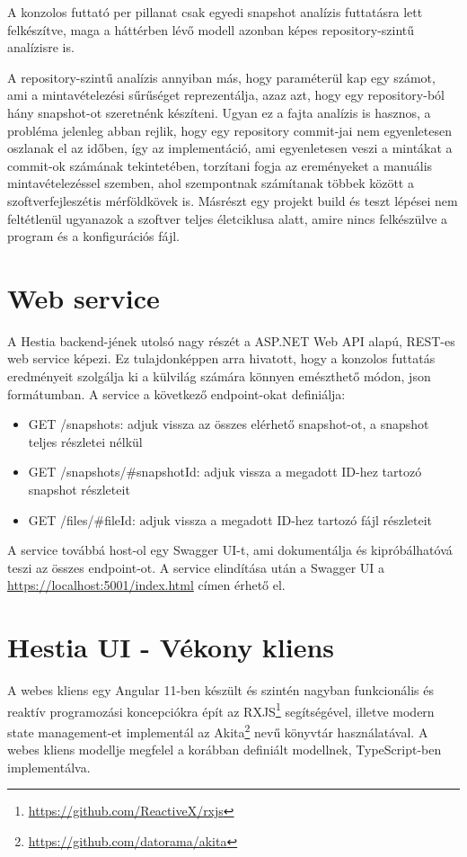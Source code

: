 A konzolos futtató per pillanat csak egyedi snapshot analízis futtatásra lett felkészítve, maga a háttérben lévő modell azonban képes repository-szintű analízisre is.

A repository-szintű analízis annyiban más, hogy paraméterül kap egy számot, ami a mintavételezési sűrűséget reprezentálja, azaz azt, hogy egy repository-ból hány snapshot-ot szeretnénk készíteni. Ugyan ez a fajta analízis is hasznos, a probléma jelenleg abban rejlik, hogy egy repository commit-jai nem egyenletesen oszlanak el az időben, így az implementáció, ami egyenletesen veszi a mintákat a commit-ok számának tekintetében, torzítani fogja az ereményeket a manuális mintavételezéssel szemben, ahol szempontnak számítanak többek között a szoftverfejleszétis mérföldkövek is. Másrészt egy projekt build és teszt lépései nem feltétlenül ugyanazok a szoftver teljes életciklusa alatt, amire nincs felkészülve a program és a konfigurációs fájl.

\section{Web service}

A Hestia backend-jének utolsó nagy részét a ASP.NET Web API alapú, REST-es web service képezi. Ez tulajdonképpen arra hivatott, hogy a konzolos futtatás eredményeit szolgálja ki a külvilág számára könnyen emészthető módon, json formátumban. A service a következő endpoint-okat definiálja:
\begin{itemize}
    \item GET /snapshots: adjuk vissza az összes elérhető snapshot-ot, a snapshot teljes részletei nélkül
    \item GET /snapshots/\#snapshotId: adjuk vissza a megadott ID-hez tartozó snapshot részleteit
    \item GET /files/\#fileId: adjuk vissza a megadott ID-hez tartozó fájl részleteit
\end{itemize}

A service továbbá host-ol egy Swagger UI-t, ami dokumentálja és kipróbálhatóvá teszi az összes endpoint-ot. A service elindítása után a Swagger UI a \url{https://localhost:5001/index.html} címen érhető el.

\section{Hestia UI - Vékony kliens}

A webes kliens egy Angular 11-ben készült és szintén nagyban funkcionális és reaktív programozási koncepciókra épít az RXJS\footnote{\url{https://github.com/ReactiveX/rxjs}} segítségével, illetve modern state management-et implementál az Akita\footnote{\url{https://github.com/datorama/akita}} nevű könyvtár használatával. A webes kliens modellje megfelel a korábban definiált modellnek, TypeScript-ben implementálva.


